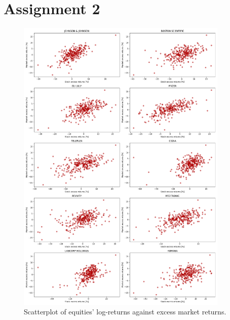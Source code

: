 \documentclass[12pt, openright, twoside]{report}
\begin{document}
\section*{Assignment 2}
\begin{figure}[h!]
    \centering
    \includegraphics[width=0.9\textwidth]{images/equities_scatterplot.png}
    \caption{Scatterplot of equities' log-returns against excess market returns.}\label{fig:equities_scatterplot}
\end{figure}

\end{document}
